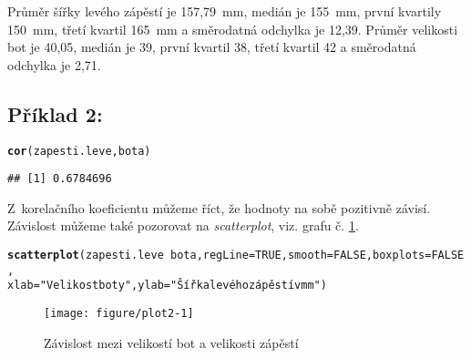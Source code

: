 \documentclass[twoside]{article}\usepackage[]{graphicx}\usepackage[]{color}
\makeatletter
\def\maxwidth{ %
  \ifdim\Gin@nat@width>\linewidth
    \linewidth
  \else
    \Gin@nat@width
  \fi
}
\newcommand{\hlnum}[1]{\textcolor[rgb]{0.686,0.059,0.569}{#1}}%
\newcommand{\hlstr}[1]{\textcolor[rgb]{0.192,0.494,0.8}{#1}}%
\newcommand{\hlopt}[1]{\textcolor[rgb]{0,0,0}{#1}}%
\newcommand{\hlstd}[1]{\textcolor[rgb]{0.345,0.345,0.345}{#1}}%
\newcommand{\hlkwc}[1]{\textcolor[rgb]{0.333,0.667,0.333}{#1}}%
\newcommand{\hlkwd}[1]{\textcolor[rgb]{0.737,0.353,0.396}{\textbf{#1}}}%
\newenvironment{kframe}{%
 \def\at@end@of@kframe{}%
 \ifinner\ifhmode%
  \def\at@end@of@kframe{\end{minipage}}%
  \begin{minipage}{\columnwidth}%
 \fi\fi%
 \def\FrameCommand##1{\hskip\@totalleftmargin \hskip-\fboxsep
 \colorbox{shadecolor}{##1}\hskip-\fboxsep
     \hskip-\linewidth \hskip-\@totalleftmargin \hskip\columnwidth}%
 \MakeFramed {\advance\hsize-\width
   \@totalleftmargin\z@ \linewidth\hsize
   \@setminipage}}%
 {\par\unskip\endMakeFramed%
 \at@end@of@kframe}
\newenvironment{knitrout}{}{} %
\makeatother
\begin{document}
Průměr šířky levého zápěstí je 157,79~\si{\milli\metre}, medián je 155~\si{\milli\metre}, první kvartily 150~\si{\milli\metre}, třetí kvartil 165~\si{\milli\metre} a směrodatná odchylka je 12,39. Průměr velikosti bot je 40,05, medián je 39, první kvartil 38, třetí kvartil 42 a směrodatná odchylka je 2,71.

\subsection*{Příklad 2:}
\begin{knitrout}
\color{fgcolor}\begin{kframe}
\begin{alltt}
\hlkwd{cor}\hlstd{(zapesti.leve, bota)}
\end{alltt}
\begin{verbatim}
## [1] 0.6784696
\end{verbatim}
\end{kframe}
\end{knitrout}

Z~korelačního koeficientu můžeme říct, že hodnoty na sobě pozitivně závisí. Závislost můžeme také pozorovat na \emph{scatterplot}, viz. grafu č. \ref{fig:plot2}.
\begin{knitrout}
\color{fgcolor}\begin{kframe}
\begin{alltt}
\hlkwd{scatterplot}\hlstd{(zapesti.leve}\hlopt{~}\hlstd{bota,} \hlkwc{regLine}\hlstd{=}\hlnum{TRUE}\hlstd{,} \hlkwc{smooth}\hlstd{=}\hlnum{FALSE}\hlstd{,} \hlkwc{boxplots}\hlstd{=}\hlnum{FALSE}\hlstd{,}
    \hlkwc{xlab}\hlstd{=}\hlstr{"Velikost boty"}\hlstd{,} \hlkwc{ylab}\hlstd{=}\hlstr{"Šířka levého zápěstí v mm"}\hlstd{)}
\end{alltt}
\end{kframe}\begin{figure}[h]
\texttt{[image: figure/plot2-1]} \caption[Závislost mezi velikostí bot a velikosti zápěstí]{Závislost mezi velikostí bot a velikosti zápěstí}\label{fig:plot2}
\end{figure}


\end{knitrout}


\newpage
\end{document}
